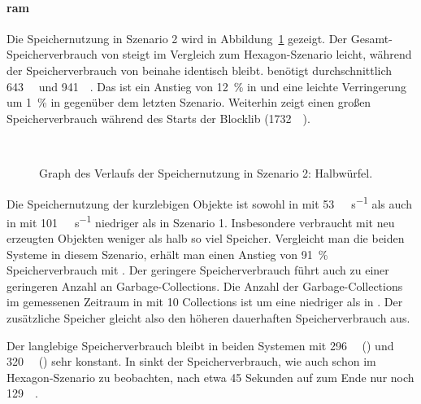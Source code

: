 \paragraph{\ac{ram}} Die Speichernutzung in Szenario 2 wird in Abbildung~\ref{fig:seed-0-cube-mem} gezeigt. Der Ge\-samt-Spei\-cher\-ver\-brauch von \sysA{} steigt im Vergleich zum Hexagon-Szenario leicht, während der Speicherverbrauch von \sysB{} beinahe identisch bleibt. \sysA{} benötigt durchschnittlich \SI{643}{\mega\byte} und \sysB{} \SI{941}{\mega\byte}. Das ist ein Anstieg von \SI{12}{\percent} in \sysA{} und eine leichte Verringerung um \SI{1}{\percent} in \sysB{} gegenüber dem letzten Szenario. Weiterhin zeigt \sysB{} einen großen Speicherverbrauch während des Starts der Blocklib (\SI{1732}{\mega\byte}).

\begin{figure}[!htb]
	\\
	\caption{Graph des Verlaufs der Speichernutzung in Szenario 2: Halbwürfel.}\label{fig:seed-0-cube-mem}
\end{figure} 

Die Speichernutzung der kurzlebigen Objekte ist sowohl in \sysA{} mit \SI{53}{\mega\byte\per\second} als auch in \sysB{} mit \SI{101}{\mega\byte\per\second} niedriger als in Szenario 1. Insbesondere \sysB{} verbraucht mit neu erzeugten Objekten weniger als halb so viel Speicher. Vergleicht man die beiden Systeme in diesem Szenario, erhält man einen Anstieg von \SI{91}{\percent} Speicherverbrauch mit \sysB{}. Der geringere Speicherverbrauch führt auch zu einer geringeren Anzahl an Garbage-Collections. Die Anzahl der Garbage-Collections im gemessenen Zeitraum in \sysB{} mit 10 Collections ist um eine niedriger als in \sysA{}. Der zusätzliche Speicher gleicht also den höheren dauerhaften Speicherverbrauch aus. 

Der langlebige Speicherverbrauch bleibt in beiden Systemen mit \SI{296}{\mega\byte} (\sysA{}) und \SI{320}{\mega\byte} (\sysB{}) sehr konstant. In \sysA{} sinkt der Speicherverbrauch, wie auch schon im Hexagon-Szenario zu beobachten, nach etwa 45 Sekunden auf zum Ende nur noch \SI{129}{\mega\byte}.